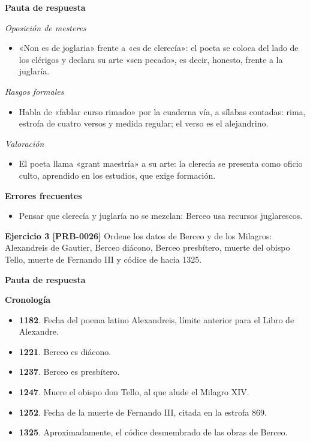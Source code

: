 \documentclass{book}
\begin{document}
\noindent\textbf{Pauta de respuesta}

\noindent\textit{Oposición de mesteres}
\begin{itemize}
\item «Non es de joglaria» frente a «es de clerecía»: el poeta se coloca del lado de los clérigos y declara su arte «sen pecado», es decir, honesto, frente a la juglaría.
\end{itemize}

\noindent\textit{Rasgos formales}
\begin{itemize}
\item Habla de «fablar curso rimado» por la cuaderna vía, a sílabas contadas: rima, estrofa de cuatro versos y medida regular; el verso es el alejandrino.
\end{itemize}

\noindent\textit{Valoración}
\begin{itemize}
\item El poeta llama «grant maestría» a su arte: la clerecía se presenta como oficio culto, aprendido en los estudios, que exige formación.
\end{itemize}

\noindent\textbf{Errores frecuentes}
\begin{itemize}
\item Pensar que clerecía y juglaría no se mezclan: Berceo usa recursos juglarescos.
\end{itemize}

\noindent\textbf{Ejercicio 3 [PRB-0026]}
Ordene los datos de Berceo y de los Milagros: Alexandreis de Gautier, Berceo diácono, Berceo presbítero, muerte del obispo Tello, muerte de Fernando III y códice de hacia 1325.


\noindent\textbf{Pauta de respuesta}

\noindent\textbf{Cronología}
\begin{itemize}
\item \textbf{1182}. Fecha del poema latino Alexandreis, límite anterior para el Libro de Alexandre.
\item \textbf{1221}. Berceo es diácono.
\item \textbf{1237}. Berceo es presbítero.
\item \textbf{1247}. Muere el obispo don Tello, al que alude el Milagro XIV.
\item \textbf{1252}. Fecha de la muerte de Fernando III, citada en la estrofa 869.
\item \textbf{1325}. Aproximadamente, el códice desmembrado de las obras de Berceo.
\end{itemize}
\end{document}
